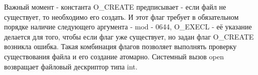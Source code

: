 Важный момент - константа O_CREATE предписывает - если файл не существует, то необходимо его создать. И этот флаг требует в обязательном порядке наличие следующего аргумента - mod - 0644, O_EXECL - её указание делается для того, чтобы если флаг уже существует, но задан флаг O_CREATE возникла ошибка. Такая комбинация флагов позволяет выполнять проверку существования файла и его создание атомарно. Системный вызов open возвращает файловый дескриптор типа int.



























